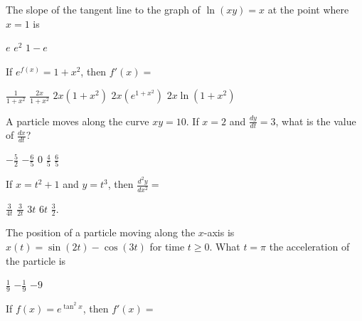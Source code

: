 \begin{questions}
\question[2] The slope of the tangent line to the graph of $\ln(xy) =
    x$ at the point where $x = 1$ is

    \begin{oneparchoices}
    \choice $e$
    \choice $e^2$
    \choice $1 - e$
    \end{oneparchoices}

\question[2] If $e^{f(x)} = 1 + x^2$, then $f'(x) = $

    \begin{oneparchoices}
    \choice $\frac{1}{1 + x^2}$
    \CorrectChoice $\frac{2x}{1 + x^2}$
    \choice $2x(1 + x^2)$
    \choice $2x(e^{1 + x^2})$
    \choice $2x\ln(1 + x^2)$
    \end{oneparchoices}

\question[2] A particle moves along the curve $xy = 10$. If $x = 2$
    and $\frac{dy}{dt} = 3$, what is the value of $\frac{dx}{dt}$?
    
    \begin{oneparchoices}
    \choice $-\frac{5}{2}$
    \CorrectChoice $-\frac{6}{5}$
    \choice $0$
    \choice $\frac{4}{5}$
    \choice $\frac{6}{5}$
    \end{oneparchoices}


\question[2] If $x = t^2 + 1$ and $y = t^3$, then $\frac{d^2y}{dx^2} = $

    \begin{oneparchoices}
    \CorrectChoice $\frac{3}{4t}$
    \choice $\frac{3}{2t}$
    \choice $3t$
    \choice $6t$
    \choice $\frac{3}{2}$.
    \end{oneparchoices}


\question[2] The position of a particle moving along the $x$-axis is
    $x(t) = \sin(2t) - \cos(3t)$ for time $t \ge 0$. What $t = \pi$
    the acceleration of the particle is

    \begin{oneparchoices}
    \choice $\frac{1}{9}$
    \choice $-\frac{1}{9}$
    \CorrectChoice $-9$
    \end{oneparchoices}

\question[2] If $f(x) = e^{\tan^2 x}$, then $f'(x) = $


\end{questions}
